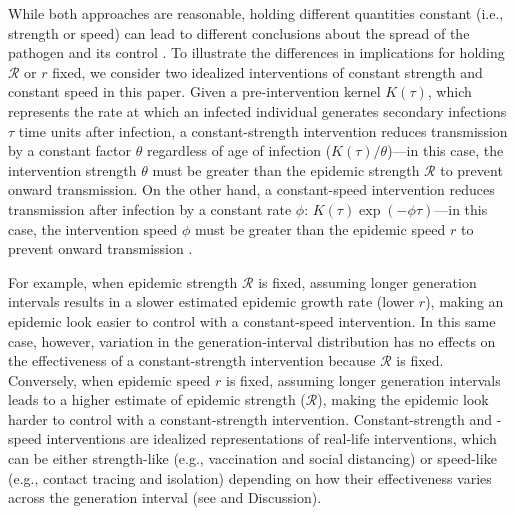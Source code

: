 \documentclass[12pt]{article}
\newcommand{\RR}{\ensuremath{{\mathcal R}}\xspace}
\begin{document}
While both approaches are reasonable, holding different quantities constant (i.e., strength or speed) can lead to different conclusions about the spread of the pathogen and its control \citep{doi:10.1098/rspb.2020.1556}.
To illustrate the differences in implications for holding $\RR$ or $r$ fixed, we consider two idealized interventions of constant strength and constant speed in this paper.
Given a pre-intervention kernel $K(\tau)$, which represents the rate at which an infected individual generates secondary infections $\tau$ time units after infection, a constant-strength intervention reduces transmission by a constant factor $\theta$ regardless of age of infection ($K(\tau)/\theta$)---in this case, the intervention strength $\theta$ must be greater than the epidemic strength $\RR$ to prevent onward transmission.
On the other hand, a constant-speed intervention reduces transmission after infection by a constant rate $\phi$: $K(\tau) \exp(-\phi \tau)$---in this case, the intervention speed $\phi$ must be greater than the epidemic speed $r$ to prevent onward transmission \citep{doi:10.1098/rspb.2020.1556}. 

For example, when epidemic strength $\RR$ is fixed, assuming longer generation intervals results in a slower estimated epidemic growth rate (lower $r$), making an epidemic look easier to control with a constant-speed intervention.
In this same case, however, variation in the generation-interval distribution has no effects on the effectiveness of a constant-strength intervention because $\RR$ is fixed.
Conversely, when epidemic speed $r$ is fixed, assuming longer generation intervals leads to a higher estimate of epidemic strength ($\RR$), making the epidemic look harder to control with a constant-strength intervention.
Constant-strength and -speed interventions are idealized representations of real-life interventions, which can be either strength-like (e.g., vaccination and social distancing) or speed-like (e.g., contact tracing and isolation) depending on how their effectiveness varies across the generation interval (see \cite{doi:10.1098/rspb.2020.1556} and Discussion).
\end{document}
